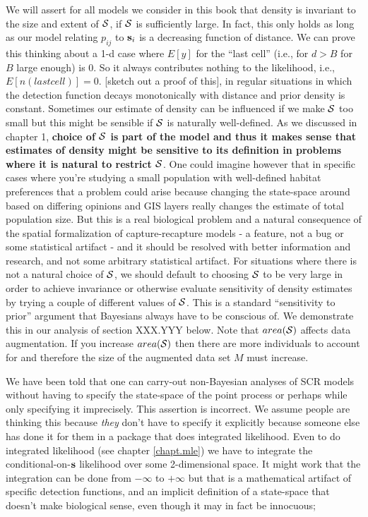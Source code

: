 We will assert for all models we consider in this book that density is
invariant to the size and extent of ${\cal S}$, if ${\cal S}$ is sufficiently large. In
fact, this only holds as long as our model relating $p_{ij}$ to ${\bf
  s}_{i}$ is a decreasing function of distance.  We can prove this
thinking about a 1-d case where $E[y]$ for the ``last cell'' (i.e.,
for $d>B$ for $B$ large enough) is 0. So it always contributes nothing to
the likelihood, i.e., $E[n(last cell)] = 0$. [sketch out a proof of
this], in regular situations in which the detection function decays
monotonically with distance and prior density is constant.  Sometimes
our estimate of density can be influenced if we make ${\cal S}$ too small but
this might be sensible if ${\cal S}$ is naturally well-defined. As we discussed
in chapter 1, {\bf choice of ${\cal S}$ is part of the model and thus it makes
  sense that estimates of density might be sensitive to its definition
  in problems where it is natural to restrict ${\cal S}$}.  
One could imagine
however that in specific cases where you're studying a small
population with well-defined habitat preferences that a problem could
arise because changing the state-space around based on differing
opinions and GIS layers really changes the estimate of total
population size. But this is a real biological problem and a natural
consequence of the spatial formalization of capture-recapture models -
a feature, not a bug or some statistical artifact - and it should be
resolved with better information and research, and not some arbitrary
statistical artifact.  For situations where there is not a natural
choice of ${\cal S}$, we should default to choosing ${\cal S}$ to be very large in order
to achieve invariance or otherwise evaluate sensitivity of density
estimates by trying a couple of different values of ${\cal S}$. This is a
standard ``sensitivity to prior'' argument that Bayesians always have
to be conscious of.  We demonstrate this in our analysis of section
XXX.YYY below. Note that $area({\cal S})$ affects data augmentation. If you
increase $area({\cal S})$ then there are more individuals to account for and
therefore the size of the augmented data set $M$ must increase.

We have been told that one can carry-out non-Bayesian analyses of SCR
models without having to specify the state-space of the point process
or perhaps while only specifying it imprecisely.  This assertion is
incorrect. We assume people are thinking this because {\it they} don't
have to specify it explicitly because someone else has done it for
them in a package that does integrated likelihood. Even to do
integrated likelihood (see chapter \ref{chapt.mle}) we have to integrate the
conditional-on-${\bf s}$ likelihood over some 2-dimensional space.  It might
work that the integration can be done from $-\infty$ to $+\infty$ but
that is a mathematical artifact of specific detection functions, and
an implicit definition of a state-space that doesn't make biological
sense, even though it may in fact be innocuous;


